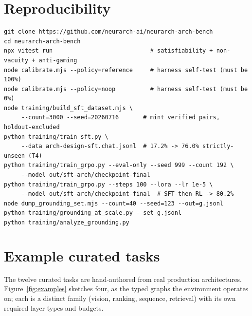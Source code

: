 \documentclass[11pt]{article}
\begin{document}
\section*{Reproducibility}
\begin{verbatim}
git clone https://github.com/neurarch-ai/neurarch-arch-bench
cd neurarch-arch-bench
npx vitest run                            # satisfiability + non-vacuity + anti-gaming
node calibrate.mjs --policy=reference     # harness self-test (must be 100%)
node calibrate.mjs --policy=noop          # harness self-test (must be 0%)
node training/build_sft_dataset.mjs \
     --count=3000 --seed=20260716       # mint verified pairs, holdout-excluded
python training/train_sft.py \
     --data arch-design-sft.chat.jsonl  # 17.2% -> 76.0% strictly-unseen (T4)
python training/train_grpo.py --eval-only --seed 999 --count 192 \
     --model out/sft-arch/checkpoint-final
python training/train_grpo.py --steps 100 --lora --lr 1e-5 \
     --model out/sft-arch/checkpoint-final  # SFT-then-RL -> 80.2%
node dump_grounding_set.mjs --count=40 --seed=123 --out=g.jsonl
python training/grounding_at_scale.py --set g.jsonl
python training/analyze_grounding.py
\end{verbatim}

\appendix
\section{Example curated tasks}
\label{app:examples}
The twelve curated tasks are hand-authored from real production architectures. Figure~\ref{fig:examples} sketches four, as the typed graphs the environment operates on; each is a distinct family (vision, ranking, sequence, retrieval) with its own required layer types and budgets.
\end{document}
